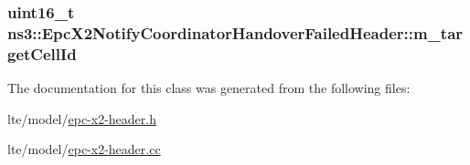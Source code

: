 \subsubsection[{\texorpdfstring{m\+\_\+target\+Cell\+Id}{m_targetCellId}}]{\setlength{\rightskip}{0pt plus 5cm}uint16\+\_\+t ns3\+::\+Epc\+X2\+Notify\+Coordinator\+Handover\+Failed\+Header\+::m\+\_\+target\+Cell\+Id\hspace{0.3cm}{\ttfamily [private]}}\hypertarget{classns3_1_1EpcX2NotifyCoordinatorHandoverFailedHeader_abcd1f20166776d16c491d8f802ec3f92}{}\label{classns3_1_1EpcX2NotifyCoordinatorHandoverFailedHeader_abcd1f20166776d16c491d8f802ec3f92}


The documentation for this class was generated from the following files\+:\begin{DoxyCompactItemize}
\item 
lte/model/\hyperlink{epc-x2-header_8h}{epc-\/x2-\/header.\+h}\item 
lte/model/\hyperlink{epc-x2-header_8cc}{epc-\/x2-\/header.\+cc}\end{DoxyCompactItemize}
